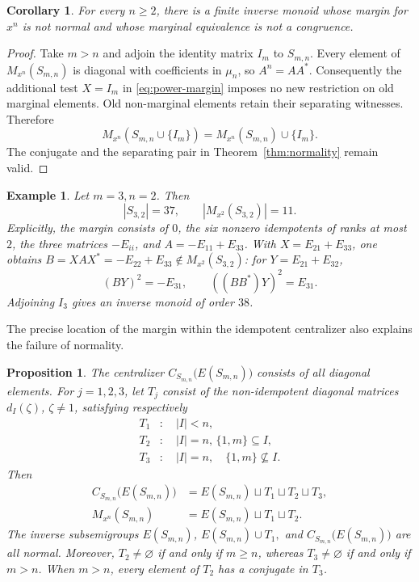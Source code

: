 \documentclass[11pt,a4paper,reqno]{amsart}
\newtheorem{corollary}[theorem]{Corollary}
\newtheorem{proposition}[theorem]{Proposition}
\newtheorem{example}[theorem]{Example}
\newcommand{\Sn}{S_{m,n}}
\newcommand{\Mn}{M_{x^n}}
\newcommand{\E}{E}
\newcommand{\cent}[1]{C_{#1}\bigl(E(#1)\bigr)}
\numberwithin{equation}{section}
\begin{document}
\begin{corollary}\label{cor:monoids}
For every $n\ge2$, there is a finite inverse monoid whose margin for $x^n$ is not normal and whose marginal equivalence is not a congruence.
\end{corollary}

\begin{proof}
Take $m>n$ and adjoin the identity matrix $I_m$ to $\Sn$. Every element of $\Mn(\Sn)$ is diagonal with coefficients in $\mu_n$, so $A^n=AA^*$. Consequently the additional test $X=I_m$ in \eqref{eq:power-margin} imposes no new restriction on old marginal elements. Old non-marginal elements retain their separating witnesses. Therefore
\[
\Mn(\Sn\cup\{I_m\})=\Mn(\Sn)\cup\{I_m\}.
\]
The conjugate and the separating pair in Theorem~\ref{thm:normality} remain valid.
\end{proof}


\begin{example}\label{ex:37}
Let $m=3,n=2$. Then
\[
|S_{3,2}|=37,\qquad |M_{x^2}(S_{3,2})|=11.
\]
Explicitly, the margin consists of $0$, the six nonzero idempotents of ranks at most $2$, the three matrices $-E_{ii}$, and $A=-E_{11}+E_{33}$. With $X=E_{21}+E_{33}$, one obtains $B=XAX^*=-E_{22}+E_{33}\notin M_{x^2}(S_{3,2})$: for $Y=E_{21}+E_{32}$,
\[
(BY)^2=-E_{31},\qquad ((BB^*)Y)^2=E_{31}.
\]
Adjoining $I_3$ gives an inverse monoid of order $38$.
\end{example}



The precise location of the margin within the idempotent centralizer also explains the failure of normality.

\begin{proposition}\label{prop:layers}
The centralizer $\cent{\Sn}$ consists of all diagonal elements. For $j=1,2,3$, let $T_j$ consist of the non-idempotent diagonal matrices $d_I(\zeta)$, $\zeta\ne1$, satisfying respectively
\[
\begin{aligned}
T_1&:\quad |I|<n,\\
T_2&:\quad |I|=n,\,\{1,m\}\subseteq I,\\
T_3&:\quad |I|=n,\quad\{1,m\}\nsubseteq I.
\end{aligned}
\]
Then
\[
\begin{aligned}
\cent{\Sn}&=\E(\Sn)\sqcup T_1\sqcup T_2\sqcup T_3,\\
\Mn(\Sn)&=\E(\Sn)\sqcup T_1\sqcup T_2.
\end{aligned}
\]
The inverse subsemigroups $\E(\Sn)$, $\E(\Sn)\cup T_1,$ and $\cent{\Sn}$ are all normal. Moreover, $T_2\ne\varnothing$ if and only if $m\ge n$, whereas $T_3\ne\varnothing$ if and only if $m>n$. When $m>n$, every element of $T_2$ has a conjugate in $T_3$.
\end{proposition}
\end{document}
